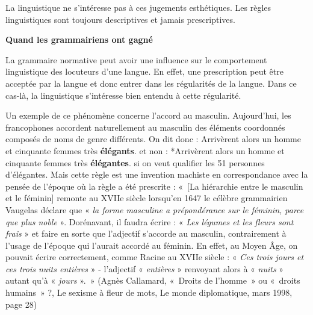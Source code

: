{    La linguistique ne s’intéresse pas à ces jugements esthétiques. Les règles linguistiques sont toujours descriptives et jamais prescriptives.

    {\bfseries
    Quand les grammairiens ont gagné
    }

    La grammaire normative peut avoir une influence sur le comportement linguistique des locuteurs d’une langue. En effet, une prescription peut être acceptée par la langue et donc entrer dans les régularités de la langue. Dans ce cas-là, la linguistique s’intéresse bien entendu à cette régularité.

    Un exemple de ce phénomène concerne l’accord au masculin. Aujourd’hui, les francophones accordent naturellement au masculin des éléments coordonnés composés de noms de genre différents. On dit donc :
    \ea
         {Arrivèrent alors un homme et cinquante femmes très} \textbf{{élégants}}.
    \z
    et non :
    \ea
        *{Arrivèrent alors un homme et cinquante femmes très} \textbf{{élégantes}}.
    \z
    si on veut qualifier les 51 personnes d’élégantes. Mais cette règle est une invention machiste en correspondance avec la pensée de l’époque où la règle a été prescrite : «~[La hiérarchie entre le masculin et le féminin] remonte au XVIIe siècle lorsqu’en 1647 le célèbre grammairien Vaugelas déclare que « \textit{la forme masculine a prépondérance sur le féminin, parce que plus noble} ». Dorénavant, il faudra écrire : « \textit{Les légumes et les fleurs sont frais} » et faire en sorte que l’adjectif s’accorde au masculin, contrairement à l’usage de l’époque qui l’aurait accordé au féminin. En effet, au Moyen Âge, on pouvait écrire correctement, comme Racine au XVIIe siècle : « \textit{Ces trois jours et ces trois nuits entières} » - l’adjectif « \textit{entières} » renvoyant alors à « \textit{nuits} » autant qu’à « \textit{jours} ».~» (Agnès Callamard, «~Droits de l’homme~» ou «~droits humains~» ?, Le sexisme à fleur de mots, Le monde diplomatique, mars 1998, page 28)
}
